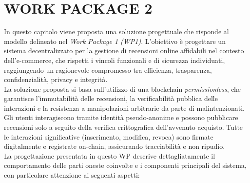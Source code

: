 %
%
%

\chapter{WORK PACKAGE 2}
    In questo capitolo viene proposta una soluzione progettuale che risponde al modello delineato nel \textit{Work Package 1 (WP1)}. L'obiettivo è progettare un sistema decentralizzato per la gestione di recensioni online affidabili nel contesto dell’e-commerce, che rispetti i vincoli funzionali e di sicurezza individuati, raggiungendo un ragionevole compromesso tra efficienza, trasparenza, confidenzialità, privacy e integrità. \\
    La soluzione proposta si basa sull'utilizzo di una blockchain \textit{permissionless}, che garantisce l'immutabilità delle recensioni, la verificabilità pubblica delle interazioni e la resistenza a manipolazioni arbitrarie da parte di malintenzionati. Gli utenti interagiscono tramite identità pseudo-anonime e possono pubblicare recensioni solo a seguito della verifica crittografica dell'avvenuto acquisto. Tutte le interazioni significative (inserimento, modifica, revoca) sono firmate digitalmente e registrate on-chain, assicurando tracciabilità e non ripudio. \\
    La progettazione presentata in questo WP descrive dettagliatamente il comportamento delle parti oneste coinvolte e i componenti principali del sistema, con particolare attenzione ai seguenti aspetti:
